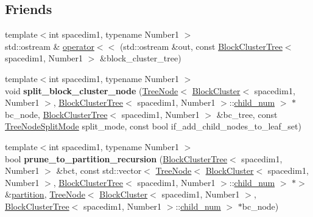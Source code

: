 \subsection*{Friends}
\begin{DoxyCompactItemize}
\item 
{\footnotesize template$<$int spacedim1, typename Number1 $>$ }\\std\+::ostream \& \hyperlink{classBlockClusterTree_a6ead7d49add78a2462eb039f00bf7f6a}{operator$<$$<$} (std\+::ostream \&out, const \hyperlink{classBlockClusterTree}{Block\+Cluster\+Tree}$<$ spacedim1, Number1 $>$ \&block\+\_\+cluster\+\_\+tree)
\item 
\mbox{\label{classBlockClusterTree_a3f70501fa33bdb6761b998978b59f1b0}} 
{\footnotesize template$<$int spacedim1, typename Number1 $>$ }\\void {\bfseries split\+\_\+block\+\_\+cluster\+\_\+node} (\hyperlink{classTreeNode}{Tree\+Node}$<$ \hyperlink{classBlockCluster}{Block\+Cluster}$<$ spacedim1, Number1 $>$, \hyperlink{classBlockClusterTree}{Block\+Cluster\+Tree}$<$ spacedim1, Number1 $>$\+::\hyperlink{classBlockClusterTree_a000c439b578bcf4fa28b7f3edd6079e9}{child\+\_\+num} $>$ $\ast$bc\+\_\+node, \hyperlink{classBlockClusterTree}{Block\+Cluster\+Tree}$<$ spacedim1, Number1 $>$ \&bc\+\_\+tree, const \hyperlink{tree_8h_a922ca07db9633957939f697a65aff11d}{Tree\+Node\+Split\+Mode} split\+\_\+mode, const bool if\+\_\+add\+\_\+child\+\_\+nodes\+\_\+to\+\_\+leaf\+\_\+set)
\item 
\mbox{\label{classBlockClusterTree_a75196d39c6db593dfdaa17f0f0cd8042}} 
{\footnotesize template$<$int spacedim1, typename Number1 $>$ }\\bool {\bfseries prune\+\_\+to\+\_\+partition\+\_\+recursion} (\hyperlink{classBlockClusterTree}{Block\+Cluster\+Tree}$<$ spacedim1, Number1 $>$ \&bct, const std\+::vector$<$ \hyperlink{classTreeNode}{Tree\+Node}$<$ \hyperlink{classBlockCluster}{Block\+Cluster}$<$ spacedim1, Number1 $>$, \hyperlink{classBlockClusterTree}{Block\+Cluster\+Tree}$<$ spacedim1, Number1 $>$\+::\hyperlink{classBlockClusterTree_a000c439b578bcf4fa28b7f3edd6079e9}{child\+\_\+num} $>$ $\ast$$>$ \&\hyperlink{classBlockClusterTree_a3ca42421f732c20fc07bdf5d5ab94319}{partition}, \hyperlink{classTreeNode}{Tree\+Node}$<$ \hyperlink{classBlockCluster}{Block\+Cluster}$<$ spacedim1, Number1 $>$, \hyperlink{classBlockClusterTree}{Block\+Cluster\+Tree}$<$ spacedim1, Number1 $>$\+::\hyperlink{classBlockClusterTree_a000c439b578bcf4fa28b7f3edd6079e9}{child\+\_\+num} $>$ $\ast$bc\+\_\+node)
$$
\end{DoxyCompactItemize}
